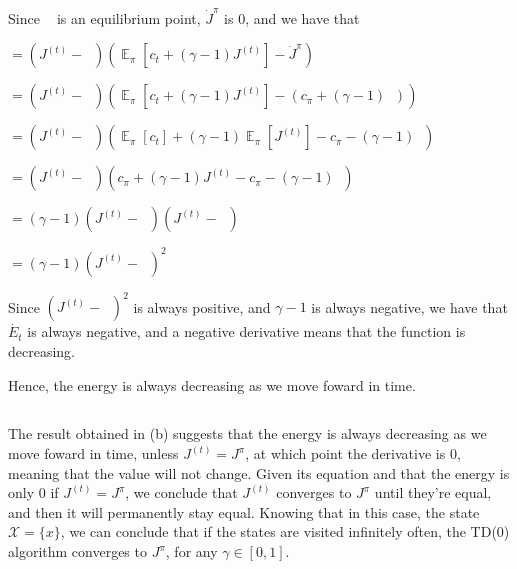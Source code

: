 \documentclass{article}
\DeclareMathOperator{\EX}{\mathbb{E}}%
\DeclareMathOperator{\JPI}{J^\pi} %
\begin{document}
\medskip

Since $\JPI$ is an equilibrium point, $\dot{J}^\pi$ is 0, and we have that

\medskip

$ = \left(J^{(t)} - \JPI \right) (\EX_\pi[c_t + (\gamma - 1) J^{(t)}] - \dot{J}^\pi)$

$ = \left(J^{(t)} - \JPI \right) (\EX_\pi[c_t + (\gamma - 1) J^{(t)}] - (c_\pi + (\gamma - 1) \JPI))$

$ = \left(J^{(t)} - \JPI \right) (\EX_\pi[c_t] + (\gamma - 1) \EX_\pi[J^{(t)}] - c_\pi - (\gamma - 1) \JPI)$

$ = \left(J^{(t)} - \JPI \right) (c_\pi +  (\gamma - 1) J^{(t)} - c_\pi - (\gamma - 1) \JPI)$

$ = (\gamma - 1) \left(J^{(t)} - \JPI \right) (J^{(t)} - \JPI)$

$ = (\gamma - 1) \left(J^{(t)} - \JPI \right)^2$

\bigskip

Since $\left(J^{(t)} - \JPI \right)^2$ is always positive, and $\gamma - 1$ is always negative, 
we have that $\dot{E_t}$ is always negative, and a negative derivative means that the function is decreasing. 

Hence, the energy is always decreasing as we move foward in time.
\subsection{}

The result obtained in (b) suggests that the energy is always decreasing as we move foward in time, unless $J^{(t)} = J^{\pi}$, 
at which point the derivative is 0, meaning that the value will not change.
Given its equation and that the energy is only 0 if $J^{(t)} = J^{\pi}$, we conclude that $J^{(t)}$ converges to $J^{\pi}$
until they're equal, and then it will permanently stay equal.
Knowing that in this case, the state $\mathcal{X} = \{x\}$, we can conclude that if the states are visited infinitely often, 
the TD(0) algorithm converges to $J^{\pi}$, for any $\gamma \in [0, 1]$.
\end{document}
